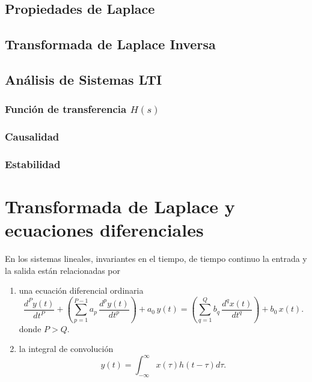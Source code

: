 \documentclass[11pt,a4paper,openany]{book}
\begin{document}
\section{Propiedades de Laplace}

\section{Transformada de Laplace Inversa}

\section{Análisis de Sistemas LTI}

\subsection{Función de transferencia $H(s)$}

\subsection{Causalidad}

\subsection{Estabilidad}

\chapter{Transformada de Laplace y ecuaciones diferenciales}

En los sistemas lineales, invariantes en el tiempo, de tiempo continuo
la entrada y la salida est\'{a}n relacionadas por 

\begin{enumerate}
	\item   una ecuaci\'{o}n diferencial ordinaria 
	\begin{equation}
		\frac{d^{P}y\left( t\right) }{dt^{P}} +
		\left(\sum_{p=1}^{P-1}a_{p} \, \frac{d^{p}y\left( t\right) }{dt^{p}}\right) + 
		a_{0} \, y(t) =
		\left(\sum_{q=1}^{Q}b_{q} \, \frac{d^{q}x\left( t\right) }{dt^{q}}\right) + 
		b_{0} \, x(t).
	\end{equation}
	donde $P > Q$.
	
	\item   la integral de convoluci\'{o}n
	\begin{equation}
		y\left( t\right) = \int_{-\infty }^{\infty} x\left( \tau \right) h\left( t-\tau \right) d\tau.
	\end{equation}
\end{enumerate}
\end{document}
